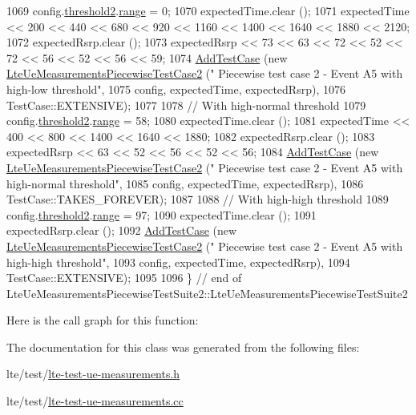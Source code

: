 \begin{DoxyCode}
1069   config.\hyperlink{structns3_1_1LteRrcSap_1_1ReportConfigEutra_a4c76552279ea09626d15b48b341bfbd1}{threshold2}.\hyperlink{structns3_1_1LteRrcSap_1_1ThresholdEutra_abd4950e20a1a93727535e8364bf85b03}{range} = 0;
1070   expectedTime.clear ();
1071   expectedTime << 200 << 440 << 680 << 920 << 1160 << 1400 << 1640 << 1880 << 2120;
1072   expectedRsrp.clear ();
1073   expectedRsrp << 73 << 63 << 72 << 52 << 72 << 56 << 52 << 56 << 59;
1074   \hyperlink{classns3_1_1TestCase_a3718088e3eefd5d6454569d2e0ddd835}{AddTestCase} (\textcolor{keyword}{new} \hyperlink{classLteUeMeasurementsPiecewiseTestCase2}{LteUeMeasurementsPiecewiseTestCase2} (\textcolor{stringliteral}{"
      Piecewise test case 2 - Event A5 with high-low threshold"},
1075                                                         config, expectedTime, expectedRsrp),
1076                TestCase::EXTENSIVE);
1077 
1078   \textcolor{comment}{// With high-normal threshold}
1079   config.\hyperlink{structns3_1_1LteRrcSap_1_1ReportConfigEutra_a4c76552279ea09626d15b48b341bfbd1}{threshold2}.\hyperlink{structns3_1_1LteRrcSap_1_1ThresholdEutra_abd4950e20a1a93727535e8364bf85b03}{range} = 58;
1080   expectedTime.clear ();
1081   expectedTime << 400 << 800 << 1400 << 1640 << 1880;
1082   expectedRsrp.clear ();
1083   expectedRsrp << 63 << 52 << 56 << 52 << 56;
1084   \hyperlink{classns3_1_1TestCase_a3718088e3eefd5d6454569d2e0ddd835}{AddTestCase} (\textcolor{keyword}{new} \hyperlink{classLteUeMeasurementsPiecewiseTestCase2}{LteUeMeasurementsPiecewiseTestCase2} (\textcolor{stringliteral}{"
      Piecewise test case 2 - Event A5 with high-normal threshold"},
1085                                                         config, expectedTime, expectedRsrp),
1086                TestCase::TAKES\_FOREVER);
1087 
1088   \textcolor{comment}{// With high-high threshold}
1089   config.\hyperlink{structns3_1_1LteRrcSap_1_1ReportConfigEutra_a4c76552279ea09626d15b48b341bfbd1}{threshold2}.\hyperlink{structns3_1_1LteRrcSap_1_1ThresholdEutra_abd4950e20a1a93727535e8364bf85b03}{range} = 97;
1090   expectedTime.clear ();
1091   expectedRsrp.clear ();
1092   \hyperlink{classns3_1_1TestCase_a3718088e3eefd5d6454569d2e0ddd835}{AddTestCase} (\textcolor{keyword}{new} \hyperlink{classLteUeMeasurementsPiecewiseTestCase2}{LteUeMeasurementsPiecewiseTestCase2} (\textcolor{stringliteral}{"
      Piecewise test case 2 - Event A5 with high-high threshold"},
1093                                                         config, expectedTime, expectedRsrp),
1094                TestCase::EXTENSIVE);
1095 
1096 \} \textcolor{comment}{// end of LteUeMeasurementsPiecewiseTestSuite2::LteUeMeasurementsPiecewiseTestSuite2}
\end{DoxyCode}


Here is the call graph for this function\+:




The documentation for this class was generated from the following files\+:\begin{DoxyCompactItemize}
\item 
lte/test/\hyperlink{lte-test-ue-measurements_8h}{lte-\/test-\/ue-\/measurements.\+h}\item 
lte/test/\hyperlink{lte-test-ue-measurements_8cc}{lte-\/test-\/ue-\/measurements.\+cc}\end{DoxyCompactItemize}
